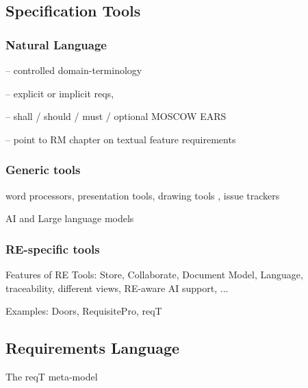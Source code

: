 \subsection{Specification Tools}

\subsubsection{Natural Language}

-- controlled domain-terminology 

-- explicit or implicit reqs, 

-- shall / should / must / optional MOSCOW EARS

-- point to RM chapter on textual feature requirements

\subsubsection{Generic tools}
  word processors, presentation tools, drawing tools , issue trackers 

  AI and Large language models 

\subsubsection{RE-specific tools}
  Features of RE Tools: Store, Collaborate, Document Model, Language, traceability, different views, RE-aware AI support, ...

  Examples: Doors, RequisitePro, reqT

\subsection{Requirements Language}

The reqT meta-model




